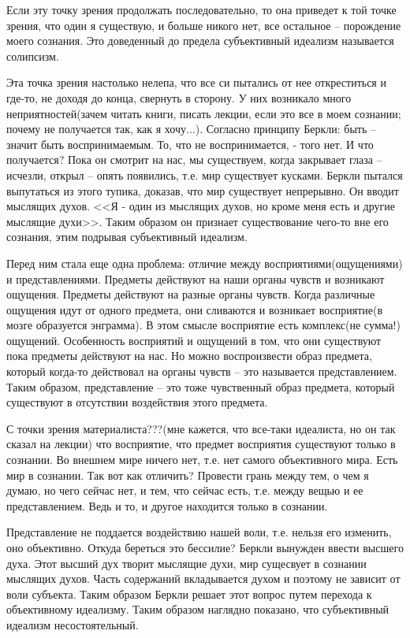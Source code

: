 Если эту точку зрения продолжать последовательно, то она приведет к той точке зрения, что один я существую, и больше никого нет, все остальное – порождение моего сознания. Это доведенный до предела субъективный идеализм называется солипсизм.

Эта точка зрения настолько нелепа, что все си пытались от нее откреститься и где-то, не доходя до конца, свернуть в сторону. У них возникало много неприятностей(зачем читать книги, писать лекции, если это все в моем сознании; почему не получается так, как я хочу...). Согласно принципу Беркли: быть – значит быть воспринимаемым. То, что не воспринимается, - того нет. И что получается? Пока он смотрит на нас, мы существуем, когда закрывает глаза – исчезли, открыл – опять появились, т.е. мир существует кусками. Беркли пытался выпутаться из этого тупика, доказав, что мир существует непрерывно. Он вводит мыслящих духов. <<Я - один из мыслящих духов, но кроме меня есть и другие мыслящие духи>>. Таким образом он признает существование чего-то вне его сознания, этим подрывая субъективный идеализм.

Перед ним стала еще одна проблема: отличие между восприятиями(ощущениями) и представлениями. Предметы действуют на наши органы чувств и возникают ощущения. Предметы действуют на разные органы чувств. Когда различные ощущения идут от одного предмета, они сливаются и возникает восприятие(в мозге образуется энграмма). В этом смысле восприятие есть комплекс(не сумма!) ощущений. Особенность восприятий и ощущений в том, что они существуют пока предметы действуют на нас. Но можно воспроизвести образ предмета, который когда-то действовал на органы чувств – это называется представлением. Таким образом, представление – это тоже чувственный образ предмета, который существуют в отсутствии воздействия этого предмета.

С точки зрения материалиста???(мне кажется, что все-таки идеалиста, но он так сказал на лекции) что восприятие, что предмет восприятия существуют только в сознании. Во внешнем мире ничего нет, т.е. нет самого объективного мира. Есть мир в сознании. Так вот как отличить? Провести грань между тем, о чем я думаю, но чего сейчас нет, и тем, что сейчас есть, т.е. между вещью и ее представлением. Ведь и то, и другое находится только в сознании.

Представление не поддается воздействию нашей воли, т.е. нельзя его изменить, оно объективно. Откуда береться это бессилие? Беркли вынужден ввести высшего духа. Этот высший дух творит мыслящие духи, мир сущесвует в сознании мыслящих духов. Часть содержаний вкладывается духом и поэтому не зависит от воли субъекта. Таким образом Беркли решает этот вопрос путем перехода к объективному идеализму. Таким образом наглядно показано, что субъективный идеализм несостоятельный.

